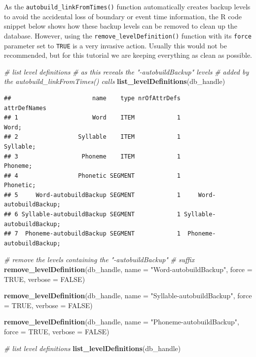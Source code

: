 \documentclass[]{book}
\newenvironment{Shaded}{\begin{snugshade}}{\end{snugshade}}
\newcommand{\CommentTok}[1]{\textcolor[rgb]{0.56,0.35,0.01}{\textit{#1}}}
\newcommand{\DataTypeTok}[1]{\textcolor[rgb]{0.13,0.29,0.53}{#1}}
\newcommand{\KeywordTok}[1]{\textcolor[rgb]{0.13,0.29,0.53}{\textbf{#1}}}
\newcommand{\NormalTok}[1]{#1}
\newcommand{\OtherTok}[1]{\textcolor[rgb]{0.56,0.35,0.01}{#1}}
\newcommand{\StringTok}[1]{\textcolor[rgb]{0.31,0.60,0.02}{#1}}
\theoremstyle{definition}
\theoremstyle{definition}
\theoremstyle{definition}
\theoremstyle{remark}
\begin{document}
As the \texttt{autobuild\_linkFromTimes()} function automatically
creates backup levels to avoid the accidental loss of boundary or event
time information, the R code snippet below shows how these backup levels
can be removed to clean up the database. However, using the
\texttt{remove\_levelDefinition()} function with its \texttt{force}
parameter set to \texttt{TRUE} is a very invasive action. Usually this
would not be recommended, but for this tutorial we are keeping
everything as clean as possible.

\begin{Shaded}
\begin{Highlighting}[]
\CommentTok{# list level definitions}
\CommentTok{# as this reveals the "-autobuildBackup" levels}
\CommentTok{# added by the autobuild_linkFromTimes() calls}
\KeywordTok{list_levelDefinitions}\NormalTok{(db_handle)}
\end{Highlighting}
\end{Shaded}

\begin{verbatim}
##                       name    type nrOfAttrDefs              attrDefNames
## 1                     Word    ITEM            1                     Word;
## 2                 Syllable    ITEM            1                 Syllable;
## 3                  Phoneme    ITEM            1                  Phoneme;
## 4                 Phonetic SEGMENT            1                 Phonetic;
## 5     Word-autobuildBackup SEGMENT            1     Word-autobuildBackup;
## 6 Syllable-autobuildBackup SEGMENT            1 Syllable-autobuildBackup;
## 7  Phoneme-autobuildBackup SEGMENT            1  Phoneme-autobuildBackup;
\end{verbatim}

\begin{Shaded}
\begin{Highlighting}[]
\CommentTok{# remove the levels containing the "-autobuildBackup"}
\CommentTok{# suffix}
\KeywordTok{remove_levelDefinition}\NormalTok{(db_handle,}
                       \DataTypeTok{name =} \StringTok{"Word-autobuildBackup"}\NormalTok{,}
                       \DataTypeTok{force =} \OtherTok{TRUE}\NormalTok{,}
                       \DataTypeTok{verbose =} \OtherTok{FALSE}\NormalTok{)}

\KeywordTok{remove_levelDefinition}\NormalTok{(db_handle,}
                       \DataTypeTok{name =} \StringTok{"Syllable-autobuildBackup"}\NormalTok{,}
                       \DataTypeTok{force =} \OtherTok{TRUE}\NormalTok{,}
                       \DataTypeTok{verbose =} \OtherTok{FALSE}\NormalTok{)}

\KeywordTok{remove_levelDefinition}\NormalTok{(db_handle,}
                       \DataTypeTok{name =} \StringTok{"Phoneme-autobuildBackup"}\NormalTok{,}
                       \DataTypeTok{force =} \OtherTok{TRUE}\NormalTok{,}
                       \DataTypeTok{verbose =} \OtherTok{FALSE}\NormalTok{)}

\CommentTok{# list level definitions}
\KeywordTok{list_levelDefinitions}\NormalTok{(db_handle)}
\end{Highlighting}
\end{Shaded}
\end{document}
